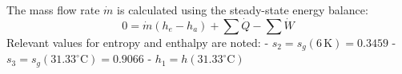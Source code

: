 The mass flow rate \( \dot{m} \) is calculated using the steady-state energy balance:  
\[
0 = \dot{m}(h_e - h_a) + \sum \dot{Q} - \sum \dot{W}
\]  
Relevant values for entropy and enthalpy are noted:  
- \( s_2 = s_g(6 \, \text{K}) = 0.3459 \)  
- \( s_3 = s_g(31.33^\circ\text{C}) = 0.9066 \)  
- \( h_1 = h(31.33^\circ\text{C}) \)